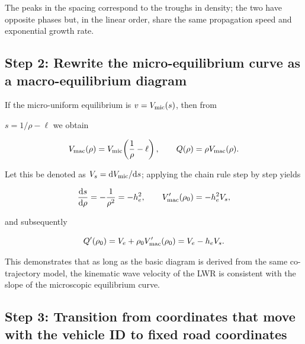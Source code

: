 \documentclass[11pt,a4paper,openany]{book}
\numberwithin{equation}{chapter}
\numberwithin{figure}{chapter}
\numberwithin{table}{chapter}
\begin{document}
The peaks in the spacing correspond to the troughs in density; the two have opposite phases but, in the linear order, share the same propagation speed and exponential growth rate.





\subsection{Step 2: Rewrite the micro-equilibrium curve as a macro-equilibrium diagram}










If the micro-uniform equilibrium is $v=V_{\rm mic}(s)$, then from

$s=1/\rho-\ell$ we obtain

\begin{equation}
V_{\rm mac}(\rho)
=V_{\rm mic}\!\left(\frac{1}{\rho}-\ell\right),
\qquad Q(\rho)=\rho V_{\rm mac}(\rho).
\label{eq:micro-macro-equilibrium-map}
\end{equation}

Let this be denoted as $V_s=\mathrm dV_{\rm mic}/\mathrm ds$; applying the chain rule step by step yields

\begin{equation}
\frac{\mathrm ds}{\mathrm d\rho}=-\frac1{\rho^2}=-h_e^2,
\qquad
V'_{\rm mac}(\rho_0)=-h_e^2V_s,
\end{equation}

and subsequently

\begin{equation}
Q'(\rho_0)
=V_e+\rho_0V'_{\rm mac}(\rho_0)
=V_e-h_eV_s.
\label{eq:micro-macro-kinematic-speed}
\end{equation}

This demonstrates that as long as the basic diagram is derived from the same co-trajectory model, the kinematic wave velocity of the LWR is consistent with the slope of the microscopic equilibrium curve.










\subsection{Step 3: Transition from coordinates that move with the vehicle ID to fixed road coordinates}
\end{document}

